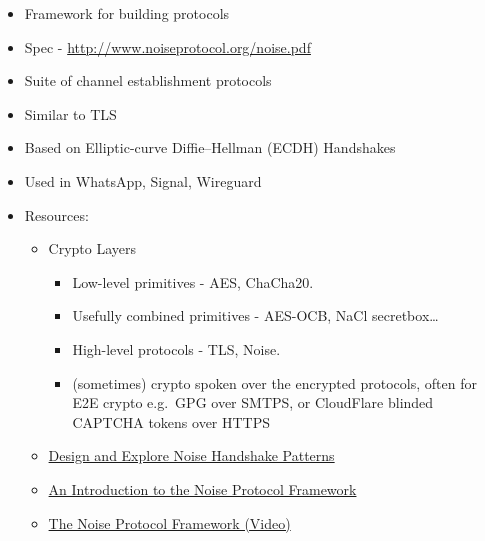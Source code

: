 \begin{itemize}
\tightlist
\item
  Framework for building protocols
\item
  Spec - \url{http://www.noiseprotocol.org/noise.pdf}
\item
  Suite of channel establishment protocols
\item
  Similar to TLS
\item
  Based on Elliptic-curve Diffie--Hellman (ECDH) Handshakes
\item
  Used in WhatsApp, Signal, Wireguard
\item
  Resources:

  \begin{itemize}
  \tightlist
  \item
    Crypto Layers

    \begin{itemize}
    \tightlist
    \item
      Low-level primitives - AES, ChaCha20.
    \item
      Usefully combined primitives - AES-OCB, NaCl secretbox\ldots{}
    \item
      High-level protocols - TLS, Noise.
    \item
      (sometimes) crypto spoken over the encrypted protocols, often for
      E2E crypto e.g.~GPG over SMTPS, or CloudFlare blinded CAPTCHA
      tokens over HTTPS
    \end{itemize}
  \item
    \href{https://noiseexplorer.com/}{Design and Explore Noise Handshake
    Patterns}
  \item
    \href{https://duo.com/labs/tech-notes/noise-protocol-framework-intro}{An
    Introduction to the Noise Protocol Framework}
  \item
    \href{https://www.youtube.com/watch?v=ceGTgqypwnQ}{The Noise
    Protocol Framework (Video)}
  \end{itemize}
\end{itemize}

